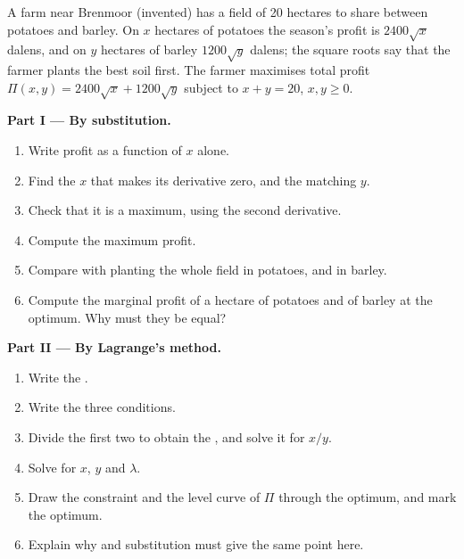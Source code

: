\begin{problem}\label{pb:b1:constrained-optimisation:farm}
A farm near Brenmoor (invented) has a field of 20 hectares to share between
potatoes and barley. On $x$ hectares of potatoes the season's profit is
$2400\sqrt x$ dalens, and on $y$ hectares of barley $1200\sqrt y$ dalens; the
square roots say that the farmer plants the best soil first. The farmer
maximises total profit $\Pi(x, y) = 2400\sqrt x + 1200\sqrt y$ subject to
$x + y = 20$, $x, y \ge 0$.

\medskip\noindent\textbf{Part I --- By substitution.}
\begin{enumerate}
  \item Write profit as a function of $x$ alone.
  \item Find the $x$ that makes its derivative zero, and the matching $y$.
  \item Check that it is a maximum, using the second derivative.
  \item Compute the maximum profit.
  \item Compare with planting the whole field in potatoes, and in barley.
  \item Compute the marginal profit of a hectare of potatoes and of barley at the optimum. Why must they be equal?
\end{enumerate}

\medskip\noindent\textbf{Part II --- By Lagrange's method.}
\begin{enumerate}[resume]
  \item Write the .
  \item Write the three conditions.
  \item Divide the first two to obtain the , and solve it for $x/y$.
  \item Solve for $x$, $y$ and $\lambda$.
  \item Draw the constraint and the level curve of $\Pi$ through the optimum, and mark the optimum.
  \item Explain why  and substitution must give the same point here.
\end{enumerate}


\end{problem}
